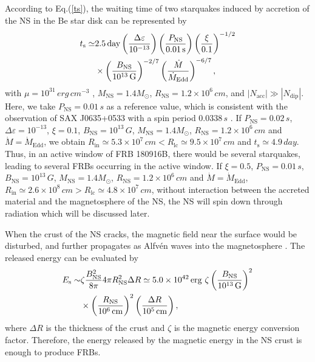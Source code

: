 \documentclass[twocolumn]{aastex62}
\begin{document}
According to Eq.(\ref{ts}), the waiting time of two starquakes induced by accretion of the NS in the Be star disk can be represented by
\begin{align}
t_{\text{s}} \simeq  & 2.5  \,\unit{day} \left(\frac{\Delta \varepsilon}{10^{-13}}\right) \left( \frac{P_{\text{NS}}}{0.01\,\unit{s}}\right)  \left(  \frac{\xi}{0.1} \right)^{-1/2}\notag \\ &\times \left(\frac{B_\text{NS}}{10^{13}\,\unit{G}}\right)^{-2/7}
 \left(\frac{\dot{M}}{\dot{M}_{\text{Edd}}}\right)^{-6/7},
\end{align}
with $\mu = 10^{31}  \,\unit{erg\,cm^{-3}}$ \citep[e.g.,][]{tom95, dou01, pio05}, $M_{\text{NS}} = 1.4M_{\odot}$, $R_{\text{NS}} = 1.2\times 10^6\,\unit{cm}$, and $|N_{\text{acc}}| \gg |N_{\mathrm{dip}}|$.
Here, we take $P_{\text{NS}}= 0.01\,\unit{s}$ as a reference value, which is consistent with the observation of SAX J0635+0533 with a spin period $0.0338\,\unit{s}$ \citep{kaa99, cus20}.
If $P_{\text{NS}}= 0.02\,\unit{s}$, $\Delta \varepsilon = 10^{-13}$, $\xi=0.1$, $B_\text{NS}=10^{13}\,\unit{G}$,  $M_{\text{NS}} = 1.4M_{\odot}$, $R_{\text{NS}} = 1.2\times 10^6\,\unit{cm}$ and $\dot{M}=\dot{M}_{\text{Edd}}$, we obtain $R_{\mathrm{in}} \simeq 5.3 \times 10^7 \,\unit{cm} < R_{\mathrm{lc}}\simeq 9.5 \times 10^7\,\unit{cm}$ and $t_{\text{s}} \simeq 4.9\,\unit{day}$.
Thus, in an active window of FRB 180916B, there would be several starquakes, leading to several FRBs occurring in the active window.
If $\xi = 0.5$, $P_{\text{NS}}= 0.01\,\unit{s}$, $B_\text{NS}=10^{13}\,\unit{G}$,  $M_{\text{NS}} = 1.4M_{\odot}$, $R_{\text{NS}} = 1.2\times 10^6\,\unit{cm}$ and $\dot{M}=\dot{M}_{\text{Edd}}$, $R_{\mathrm{in}} \simeq 2.6 \times 10^8 \,\unit{cm} > R_{\mathrm{lc}}\simeq 4.8 \times 10^7\,\unit{cm}$, without interaction between the accreted material and the magnetosphere of the NS, the NS will spin down through radiation which will be discussed later.

When the crust of the NS cracks, the magnetic field near the surface would be disturbed, and further propagates as Alfv\'en waves into the magnetosphere \citep[e.g.,][]{tom95,kum20,lu20,yan21}. The released energy can be evaluated by
\begin{align}
E_{\text{s}} \sim & \zeta \frac{B_{\text{NS}}^2}{8\pi} 4\pi R^2_{\text{NS}} \Delta R \simeq  5.0\times10^{42} \,\unit{erg} ~\zeta \left(\frac{B_\text{NS}}{10^{13}\,\unit{G}}\right)^{2} \notag \\
 &\times \left(\frac{R_{\text{NS}}}{10^6\,\unit{cm}}\right)^{2} \left(\frac{\Delta R}{10^5\,\unit{cm}}\right),
\end{align}
where $ \Delta R$ is the thickness of the crust and $\zeta$ is the magnetic energy conversion factor.
Therefore, the energy released by the magnetic energy in the NS crust is enough to produce FRBs.
\end{document}
